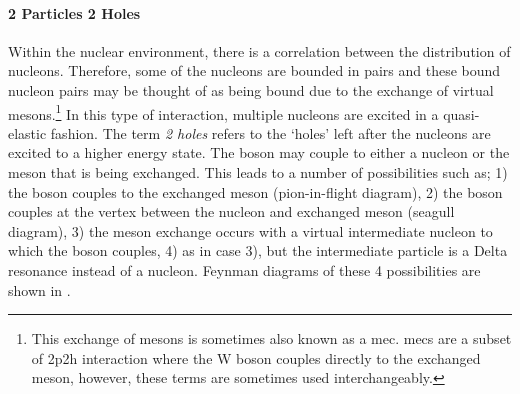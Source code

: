 \paragraph{2 Particles 2 Holes}
Within the nuclear environment, there is a correlation between the distribution of nucleons. Therefore, some of the nucleons are bounded in pairs and these bound nucleon pairs may be thought of as being bound due to the exchange of virtual mesons.\footnote{This exchange of mesons is sometimes also known as a \gls{mec}. \glspl{mec} are a subset of \gls{2p2h} interaction where the W boson couples directly to the exchanged meson, however, these terms are sometimes used interchangeably.} In this type of interaction, multiple nucleons are excited in a quasi-elastic fashion. The term \textit{2 holes} refers to the `holes' left after the nucleons are excited to a higher energy state. The boson may couple to either a nucleon or the meson that is being exchanged. This leads to a number of possibilities such as; 1) the boson couples to the exchanged meson (pion-in-flight diagram), 2) the boson couples at the vertex between the nucleon and exchanged meson (seagull diagram), 3) the meson exchange occurs with a virtual intermediate nucleon to which the boson couples, 4) as in case 3), but the intermediate particle is a Delta resonance instead of a nucleon. Feynman diagrams of these 4 possibilities are shown in  \cite{Measurement_of_the_Antineutrino_Double-Differential_Charged-Current_Quasi-Elastic_Scattering_Cross_Section_at_MINERvA_book}\cite{Adjusting_neutrino_interaction_models_and_evaluating_uncertainties_using_NOvA_near_detector_data}
\cite{Seagull_and_pion-in-flight_mec}.

